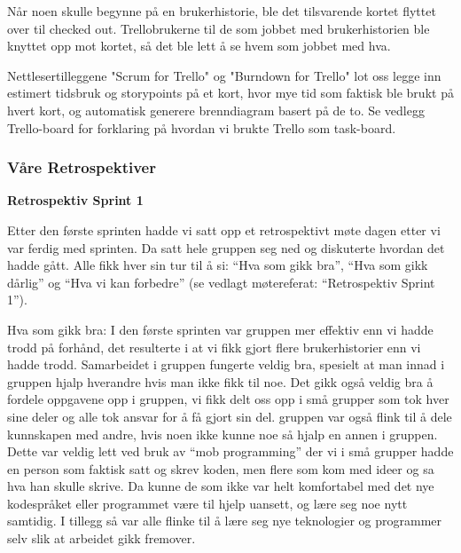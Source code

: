 \documentclass[12pt,a4paper,norsk]{article}
\begin{document}
    Når noen skulle begynne på en brukerhistorie, ble det tilsvarende kortet flyttet over til checked out. Trellobrukerne til de som jobbet med brukerhistorien ble knyttet opp mot kortet, så det ble lett å se hvem som jobbet med hva.
    
    Nettlesertilleggene "Scrum for Trello" og "Burndown for Trello" lot oss legge inn estimert tidsbruk og storypoints på et kort, hvor mye tid som faktisk ble brukt på hvert kort, og automatisk generere brenndiagram basert på de to. Se vedlegg Trello-board for forklaring på hvordan vi brukte Trello som task-board.
	\subsubsection{Våre Retrospektiver}
	
\bigskip \noindent \textbf{Retrospektiv Sprint 1}
\par Etter den første sprinten hadde vi satt opp et retrospektivt møte dagen etter vi var ferdig med sprinten. Da satt hele gruppen seg ned og diskuterte hvordan det hadde gått. Alle fikk hver sin tur til å si: “Hva som gikk bra”, “Hva som gikk dårlig” og “Hva vi kan forbedre” (se vedlagt møtereferat: “Retrospektiv Sprint 1”).
 
Hva som gikk bra:
I den første sprinten var gruppen mer effektiv enn vi hadde trodd på forhånd, det resulterte i at vi fikk gjort flere brukerhistorier enn vi hadde trodd. Samarbeidet i gruppen fungerte veldig bra, spesielt at man innad i gruppen hjalp hverandre hvis man ikke fikk til noe. Det gikk også veldig bra å fordele oppgavene opp i gruppen, vi fikk delt oss opp i små grupper som tok hver sine deler og alle tok ansvar for å få gjort sin del. gruppen var også flink til å dele kunnskapen med andre, hvis noen ikke kunne noe så hjalp en annen i gruppen. Dette var veldig lett ved bruk av “mob programming” der vi i små grupper hadde en person som faktisk satt og skrev koden, men flere som kom med ideer og sa hva han skulle skrive. Da kunne de som ikke var helt komfortabel med det nye kodespråket eller programmet være til hjelp uansett, og lære seg noe nytt samtidig. I tillegg så var alle flinke til å lære seg nye teknologier og programmer selv slik at arbeidet gikk fremover. 
\end{document}
